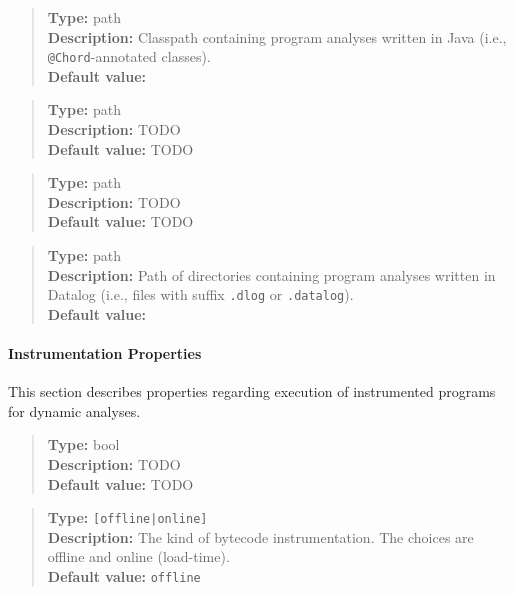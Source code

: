 \begin{quote}
{\bf Type:} path \\
{\bf Description:} Classpath containing program analyses written in Java (i.e., {\tt @Chord}-annotated classes).  \\
{\bf Default value:} 
\end{quote}

\begin{quote}
{\bf Type:} path \\
{\bf Description:} TODO \\
{\bf Default value:} TODO
\end{quote}

\begin{quote}
{\bf Type:} path \\
{\bf Description:} TODO \\
{\bf Default value:} TODO
\end{quote}

\begin{quote}
{\bf Type:} path  \\
{\bf Description:} Path of directories containing program analyses written in Datalog (i.e., files with suffix {\tt .dlog} or {\tt .datalog}). \\
{\bf Default value:} 
\end{quote}

\paragraph{Instrumentation Properties}

This section describes properties regarding execution of instrumented programs for dynamic analyses.

\begin{quote}
{\bf Type:} bool \\
{\bf Description:} TODO \\
{\bf Default value:} TODO
\end{quote}

\begin{quote}
{\bf Type:} {\tt [offline|online]}  \\
{\bf Description:} The kind of bytecode instrumentation.  The choices are offline and online (load-time).  \\
{\bf Default value:} {\tt offline}
\end{quote}


